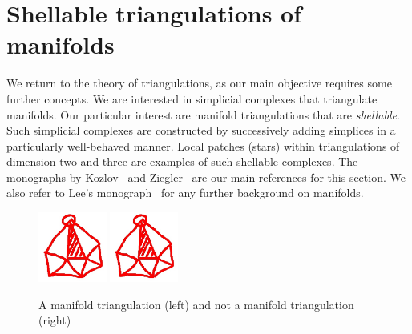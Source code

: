 \documentclass[10pt,a4paper]{article}
\begin{document}
\section{Shellable triangulations of manifolds}\label{section:advancedtriangulations}

We return to the theory of triangulations,
as our main objective requires some further concepts.
We are interested in simplicial complexes that triangulate manifolds. 
Our particular interest are manifold triangulations that are \emph{shellable}.
Such simplicial complexes are constructed by successively adding simplices in a particularly well-behaved manner. 
Local patches (stars) within triangulations of dimension two and three are examples of such shellable complexes. 
The monographs by Kozlov~\cite{kozlov2008combinatorial} and Ziegler~\cite{ziegler1995lectures} are our main references for this section. 
We also refer to Lee's monograph~\cite{lee2011topological} for any further background on manifolds. 

\begin{figure}[h]
\centerline{\includegraphics[width=0.2\textwidth]{revision/homotopic_ball.jpg} \quad \includegraphics[width=0.2\textwidth]{revision/homotopic_ball.jpg}}
\caption{A manifold triangulation (left) and not a manifold triangulation (right)}
\label{figure:not_manifold_triang}
\end{figure}
\end{document}
